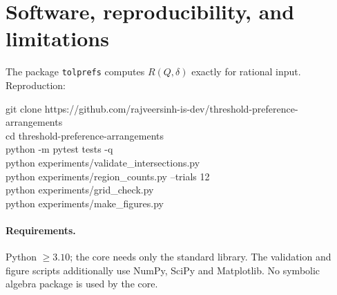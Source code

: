 ﻿\documentclass[11pt,a4paper]{article}
\theoremstyle{definition}
\theoremstyle{remark}
\begin{document}
\section{Software, reproducibility, and limitations}
\label{sec:soft}

The package \texttt{tolprefs} computes $R(Q,\delta)$ exactly for rational input.
Reproduction:

\begin{center}
\begin{minipage}{0.92\linewidth}
\small
\ttfamily
git clone https://github.com/rajveersinh-is-dev/threshold-preference-arrangements\\
cd threshold-preference-arrangements\\
python -m pytest tests -q\\
python experiments/validate\_intersections.py\\
python experiments/region\_counts.py --trials 12\\
python experiments/grid\_check.py\\
python experiments/make\_figures.py
\end{minipage}
\end{center}

\paragraph{Requirements.}  Python $\ge3.10$; the core needs only the standard
library.  The validation and figure scripts additionally use NumPy, SciPy and
Matplotlib.  No symbolic algebra package is used by the core.
\end{document}
